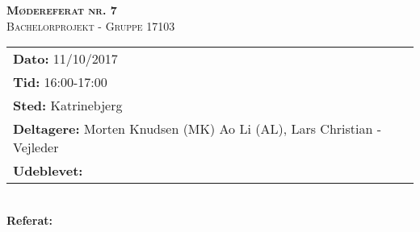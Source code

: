 
\newcommand{\HRule}{\rule{\linewidth}{0.1mm}}


	\begin{center}
		{\huge \bfseries \textsc{Mødereferat nr. 7}}\\
		\textsc{\large Bachelorprojekt - Gruppe 17103}\\[0.3cm]
	\end{center}
	\begin{tabular}{ll}
	\large \textbf{Dato:} 11/10/2017  	\\ %
	\large \textbf{Tid:}  16:00-17:00 	\\ %
	\large \textbf{Sted:} Katrinebjerg		\\ %
	\large \textbf{Deltagere:} Morten Knudsen (MK) Ao Li (AL), Lars Christian - Vejleder \\
	\large \textbf{Udeblevet:} 
	\end{tabular}\\
	\phantom{\,}\hspace{0.1em} \large \textbf{Referat:}
